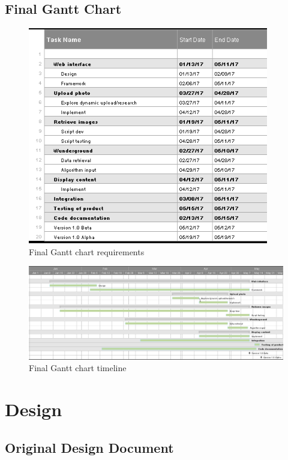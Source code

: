 \documentclass[onecolumn, draftclsnofoot,10pt, compsoc]{IEEEtran}
\begin{document}
\begin{flushleft}
\subsection{Final Gantt Chart}
\begin{figure}[H]
\centering
  \includegraphics{gantt_final1.PNG}
  \caption{Final Gantt chart requirements}
  \label{fig:gantt_final}
\end{figure}
\begin{figure}[H]
\centering
    \includegraphics[width=\textwidth]{gantt_final2.PNG}
  \caption{Final Gantt chart timeline}
  \label{fig:gantt_final}
\end{figure}
 
\section{Design}
\subsection{Original Design Document}

 

\end{flushleft}
\end{document}
